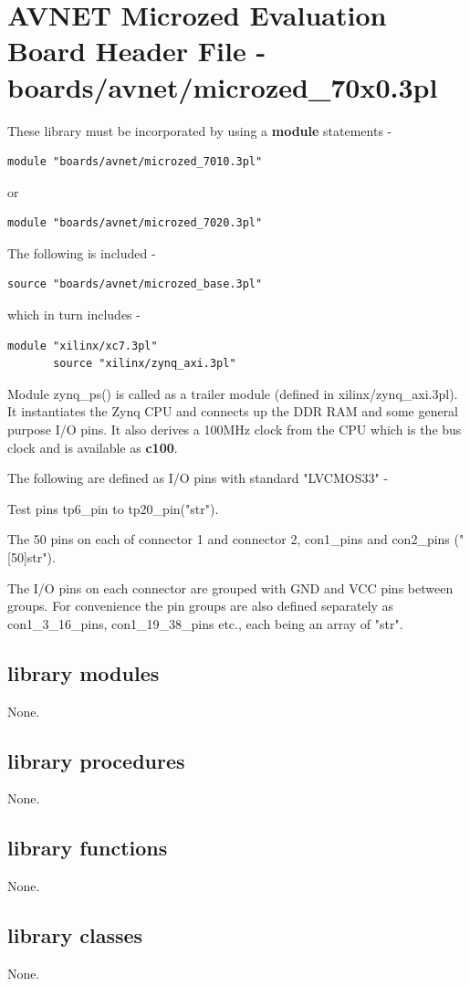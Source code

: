 \pagebreak

\section{AVNET Microzed Evaluation Board Header File - boards/avnet/microzed\_70x0.3pl}

    
    These library must be incorporated by using a {\bf module} statements -
    \begin{lstlisting}[gobble=4, language=threepl]
       module "boards/avnet/microzed_7010.3pl"
    \end{lstlisting}
    or
    \begin{lstlisting}[gobble=4, language=threepl]
       module "boards/avnet/microzed_7020.3pl"
    \end{lstlisting}
    
    The following is included -
    \begin{lstlisting}[gobble=4, language=threepl]
       source "boards/avnet/microzed_base.3pl"
    \end{lstlisting}
    which in turn includes -
    \begin{lstlisting}[gobble=4, language=threepl]
       module "xilinx/xc7.3pl"
       source "xilinx/zynq_axi.3pl"
    \end{lstlisting}
    
    Module zynq\_ps() is called as a trailer module (defined in
    xilinx/zynq\_axi.3pl). It instantiates the Zynq CPU and connects up the DDR
    RAM and some general purpose I/O pins. It also derives a 100MHz clock from
    the CPU which is the bus clock and is available as {\bf c100}.
    
    The following are defined as I/O pins with standard "LVCMOS33" -
    
    Test pins tp6\_pin to tp20\_pin("str").
    
    The 50 pins on each of connector 1 and connector 2,
    con1\_pins and con2\_pins ("[50]str").
    
    The I/O pins on each connector are grouped with GND and VCC pins between
    groups. For convenience the pin groups are also defined separately
    as con1\_3\_16\_pins, con1\_19\_38\_pins etc., each being an array of "str".
    




    \subsection{library modules}
    
        None.




    \subsection{library procedures}
    
        None.
        



    \subsection{library functions}
    
        None.


    \subsection{library classes}
    
        None.
